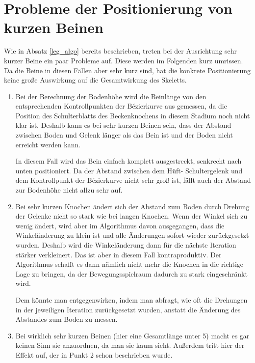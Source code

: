 \section{Probleme der Positionierung von kurzen Beinen}
\label{leg_positioning_short_legs}

Wie in Absatz \ref{leg_algo} bereits beschrieben, treten bei der Ausrichtung sehr kurzer Beine ein paar Probleme auf. Diese werden im Folgenden kurz umrissen. Da die Beine in diesen Fällen aber sehr kurz sind, hat die konkrete Positionierung keine große Auswirkung auf die Gesamtwirkung des Skeletts. 

\begin{enumerate}
 \item %
   Bei der Berechnung der Bodenhöhe wird die Beinlänge von den entsprechenden Kontrollpunkten der Bézierkurve aus gemessen, da die Position des Schulterblatts \bzw des Beckenknochens in diesem Stadium noch nicht klar ist. Deshalb kann es bei sehr kurzen Beinen sein, dass der Abstand zwischen Boden und Gelenk länger als das Bein ist und der Boden nicht erreicht werden kann.
   
   In diesem Fall wird das Bein einfach komplett ausgestreckt, senkrecht nach unten positioniert. Da der Abstand zwischen dem Hüft- \bzw Schultergelenk und dem Kontrollpunkt der Bézierkurve nicht sehr groß ist, fällt auch der Abstand zur Bodenhöhe nicht allzu sehr auf.
   
 \item %
   Bei sehr kurzen Knochen ändert sich der Abstand zum Boden durch Drehung der Gelenke nicht so stark wie bei langen Knochen. Wenn der Winkel sich zu wenig ändert, wird aber im Algorithmus davon ausgegangen, dass die Winkeländerung zu klein ist und alle Änderungen sofort wieder zurückgesetzt wurden. Deshalb wird die Winkeländerung dann für die nächste Iteration stärker verkleinert. Das ist aber in diesem Fall kontraproduktiv. Der Algorithmus schafft es dann nämlich nicht mehr die Knochen in die richtige Lage zu bringen, da der Bewegungsspielraum dadurch zu stark eingeschränkt wird.
   
   Dem könnte man entgegenwirken, indem man abfragt, wie oft die Drehungen in der jeweiligen Iteration zurückgesetzt wurden, anstatt die Änderung des Abstandes zum Boden zu messen.
   
 \item %
   Bei wirklich sehr kurzen Beinen (hier eine Gesamtlänge unter 5) macht es gar keinen Sinn sie anzuordnen, da man sie kaum sieht. Außerdem tritt hier der Effekt auf, der in Punkt 2 schon beschrieben wurde.
   

\end{enumerate}
